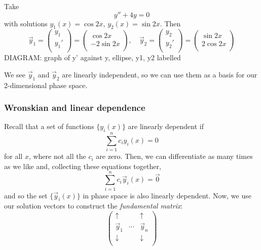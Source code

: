 \documentclass{../template/note}
\begin{document}
    \begin{example}
        Take
        \[
            y'' + 4y = 0
        \]
        with solutions \(y_1(x) = \cos 2x\), \(y_2(x) = \sin 2x\). Then
        \[
            \vec y_1 = \begin{pmatrix}
             y_1 \\
             y_1' \\
            \end{pmatrix} = \begin{pmatrix}
             \cos 2x \\
             -2 \sin 2x \\
            \end{pmatrix}, \quad
            \vec y_2 = \begin{pmatrix}
             y_2 \\
             y_2' \\
            \end{pmatrix} = \begin{pmatrix}
             \sin 2x \\
             2 \cos 2x \\
            \end{pmatrix}
        \]
        DIAGRAM: graph of y' against y, ellipse, y1, y2 labelled

        We see \(\vec y_1\) and \(\vec y_2\) are linearly independent, so we can use them as a basis for our 2-dimensional phase space.
    \end{example}
    
    \subsubsection{Wronskian and linear dependence}

    Recall that a set of functions \(\{y_i(x)\}\) are linearly dependent if
    \[
        \sum_{i=1}^n c_i y_i(x) = 0
    \]
    for all \(x\), where not all the \(c_i\) are zero. Then, we can differentiate as many times as we like and, collecting these equations together,
    \[
        \sum_{i=1}^n c_i \vec y_i(x) = \vec 0
    \]
    and so the set \(\{\vec y_i(x)\}\) in phase space is also linearly dependent. Now, we use our solution vectors to construct the \emph{fundamental matrix}:
    \[
        \begin{pmatrix}
         \uparrow &  & \uparrow \\
         \vec y_1 & \cdots & \vec y_n \\
         \downarrow &  & \downarrow \\
        \end{pmatrix}
    \]
    
\end{document}
